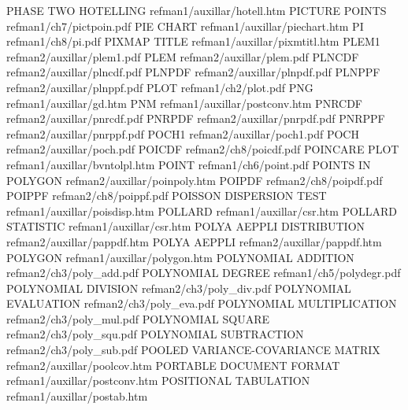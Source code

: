 PHASE TWO HOTELLING                     refman1/auxillar/hotell.htm
PICTURE POINTS                          refman1/ch7/pictpoin.pdf
PIE CHART                               refman1/auxillar/piechart.htm
PI                                      refman1/ch8/pi.pdf
PIXMAP TITLE                            refman1/auxillar/pixmtitl.htm
PLEM1                                   refman2/auxillar/plem1.pdf
PLEM                                    refman2/auxillar/plem.pdf
PLNCDF                                  refman2/auxillar/plncdf.pdf
PLNPDF                                  refman2/auxillar/plnpdf.pdf
PLNPPF                                  refman2/auxillar/plnppf.pdf
PLOT                                    refman1/ch2/plot.pdf
PNG                                     refman1/auxillar/gd.htm
PNM                                     refman1/auxillar/postconv.htm
PNRCDF                                  refman2/auxillar/pnrcdf.pdf
PNRPDF                                  refman2/auxillar/pnrpdf.pdf
PNRPPF                                  refman2/auxillar/pnrppf.pdf
POCH1                                   refman2/auxillar/poch1.pdf
POCH                                    refman2/auxillar/poch.pdf
POICDF                                  refman2/ch8/poicdf.pdf
POINCARE PLOT                           refman1/auxillar/bvntolpl.htm
POINT                                   refman1/ch6/point.pdf
POINTS IN POLYGON                       refman2/auxillar/poinpoly.htm
POIPDF                                  refman2/ch8/poipdf.pdf
POIPPF                                  refman2/ch8/poippf.pdf
POISSON DISPERSION TEST                 refman1/auxillar/poisdisp.htm
POLLARD                                 refman1/auxillar/csr.htm
POLLARD STATISTIC                       refman1/auxillar/csr.htm
POLYA AEPPLI DISTRIBUTION               refman2/auxillar/pappdf.htm
POLYA AEPPLI                            refman2/auxillar/pappdf.htm
POLYGON                                 refman1/auxillar/polygon.htm
POLYNOMIAL ADDITION                     refman2/ch3/poly_add.pdf
POLYNOMIAL DEGREE                       refman1/ch5/polydegr.pdf
POLYNOMIAL DIVISION                     refman2/ch3/poly_div.pdf
POLYNOMIAL EVALUATION                   refman2/ch3/poly_eva.pdf
POLYNOMIAL MULTIPLICATION               refman2/ch3/poly_mul.pdf
POLYNOMIAL SQUARE                       refman2/ch3/poly_squ.pdf
POLYNOMIAL SUBTRACTION                  refman2/ch3/poly_sub.pdf
POOLED VARIANCE-COVARIANCE MATRIX       refman2/auxillar/poolcov.htm
PORTABLE DOCUMENT FORMAT                refman1/auxillar/postconv.htm
POSITIONAL TABULATION                   refman1/auxillar/postab.htm
